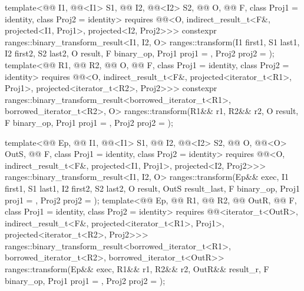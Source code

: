\begin{itemdecl}
template<@@ I1, @@<I1> S1, @@ I2, @@<I2> S2,
         @@ O, @@ F, class Proj1 = identity,
         class Proj2 = identity>
  requires @@<O, indirect_result_t<F&, projected<I1, Proj1>,
                               projected<I2, Proj2>>>
  constexpr ranges::binary_transform_result<I1, I2, O>
    ranges::transform(I1 first1, S1 last1, I2 first2, S2 last2, O result,
                      F binary_op, Proj1 proj1 = {}, Proj2 proj2 = {});
template<@@ R1, @@ R2, @@ O,
         @@ F, class Proj1 = identity, class Proj2 = identity>
  requires @@<O, indirect_result_t<F&, projected<iterator_t<R1>, Proj1>,
                               projected<iterator_t<R2>, Proj2>>>
  constexpr ranges::binary_transform_result<borrowed_iterator_t<R1>, borrowed_iterator_t<R2>, O>
    ranges::transform(R1&& r1, R2&& r2, O result,
                      F binary_op, Proj1 proj1 = {}, Proj2 proj2 = {});

template<@@ Ep, @@ I1, @@<I1> S1,
         @@ I2, @@<I2> S2,
         @@ O, @@<O> OutS,
         @@ F, class Proj1 = identity, class Proj2 = identity>
  requires @@<O, indirect_result_t<F&, projected<I1, Proj1>,
                               projected<I2, Proj2>>>
  ranges::binary_transform_result<I1, I2, O>
    ranges::transform(Ep&& exec, I1 first1, S1 last1, I2 first2, S2 last2,
                      O result, OutS result_last,
                      F binary_op, Proj1 proj1 = {}, Proj2 proj2 = {});
template<@@ Ep, @@ R1, @@ R2,
         @@ OutR, @@ F,
         class Proj1 = identity, class Proj2 = identity>
  requires @@<iterator_t<OutR>,
                               indirect_result_t<F&, projected<iterator_t<R1>, Proj1>,
                               projected<iterator_t<R2>, Proj2>>>
  ranges::binary_transform_result<borrowed_iterator_t<R1>, borrowed_iterator_t<R2>,
                                  borrowed_iterator_t<OutR>>
    ranges::transform(Ep&& exec, R1&& r1, R2&& r2, OutR&& result_r,
                      F binary_op, Proj1 proj1 = {}, Proj2 proj2 = {});
\end{itemdecl}

